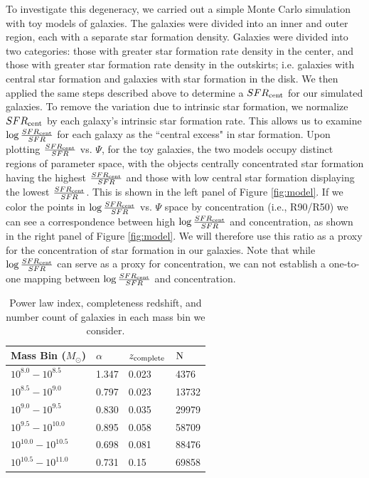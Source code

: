 \documentclass[iop]{emulateapj}
\begin{document}
To investigate this degeneracy, we carried out a simple Monte Carlo simulation with toy models of galaxies. The galaxies were divided into an inner and outer region, each with a separate star formation density. Galaxies were divided into two categories: those with greater star formation rate density in the center, and those with greater star formation rate density in the outskirts; i.e. galaxies with central star formation and galaxies with star formation in the disk. We then applied the same steps described above to determine a $SFR_{\rm cent}$ for our simulated galaxies. To remove the variation due to intrinsic star formation, we normalize $SFR_{\rm cent}$ by each galaxy's intrinsic star formation rate. This allows us to examine $ \log \frac{SFR_{\rm cent}}{SFR}$ for each galaxy as the ``central excess" in star formation. Upon plotting $\frac{SFR_{\rm cent}}{SFR}$ vs. $\Psi$, for the toy galaxies, the two models occupy distinct regions of parameter space, with the objects centrally concentrated star formation having the highest $\frac{SFR_{\rm cent}}{SFR}$ and those with low central star formation displaying the lowest $\frac{SFR_{\rm cent}}{SFR}$. This is shown in the left panel of Figure \ref{fig:model}. If we color the points in $ \log \frac{SFR_{\rm cent}}{SFR}$ vs. $\Psi$ space by concentration (i.e., R90/R50) we can see a correspondence between high $\log \frac{SFR_{\rm cent}}{SFR}$ and concentration, as shown in the right panel of Figure \ref{fig:model}. We will therefore use this ratio as a proxy for the concentration of star formation in our galaxies. Note that while $\log \frac{SFR_{\rm cent}}{SFR}$ can serve as a proxy for concentration, we can not establish a one-to-one mapping between $\log \frac{SFR_{\rm cent}}{SFR}$ and concentration. 

\begin{table}[]
	\centering
	\label{tab:infotab}
	\begin{tabular}{llll} 
	\hline 
	Mass Bin ($M_{\odot}$)& $\alpha$ & $z_{\rm complete}$ 	&  $\rm N$ \\
	\hline
	\hline 
	$10^{8.0} - 10^{8.5}$   & 1.347 & 0.023 & 4376 \\ 
	$10^{8.5} - 10^{9.0}$   & 0.797 & 0.023 & 13732\\
	$10^{9.0} - 10^{9.5}$   & 0.830  & 0.035  & 29979 \\ 
	$10^{9.5} - 10^{10.0}$   & 0.895    & 0.058 & 58709 \\
	$10^{10.0} - 10^{10.5}$   &  0.698 & 0.081 & 88476 \\
	$10^{10.5} - 10^{11.0}$   &  0.731 & 0.15 & 69858 \\
	\hline 
	\end{tabular}
		\caption{Power law index, completeness redshift, and number count of galaxies in each mass bin we consider. }
\end{table}
\end{document}
